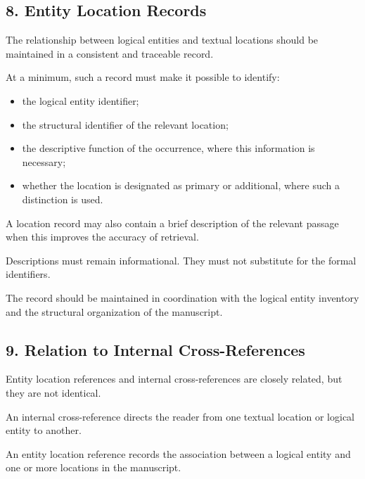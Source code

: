 
\subsection*{8. Entity Location Records}

The relationship between
logical entities and textual
locations should be maintained
in a consistent and traceable
record.

At a minimum, such a record
must make it possible to
identify:

\begin{itemize}
    \item the logical entity
    identifier;
    \item the structural
    identifier of the
    relevant location;
    \item the descriptive
    function of the occurrence,
    where this information
    is necessary;
    \item whether the location
    is designated as primary
    or additional, where
    such a distinction is used.
\end{itemize}

A location record may also
contain a brief description
of the relevant passage
when this improves the
accuracy of retrieval.

Descriptions must remain
informational. They must
not substitute for the
formal identifiers.

The record should be maintained
in coordination with the
logical entity inventory
and the structural organization
of the manuscript.


\subsection*{9. Relation to Internal
Cross-References}

Entity location references
and internal cross-references
are closely related, but
they are not identical.

An internal cross-reference
directs the reader from
one textual location or
logical entity to another.

An entity location reference
records the association
between a logical entity
and one or more locations
in the manuscript.

